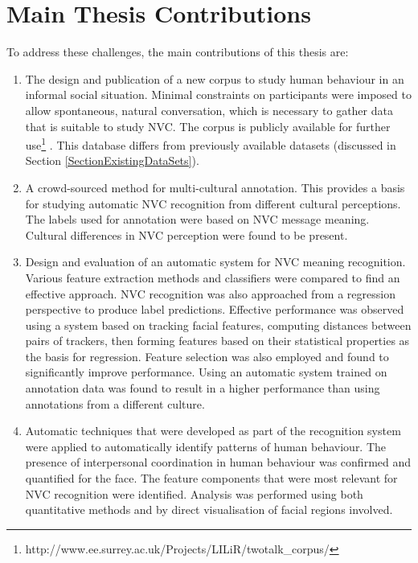 \section{Main Thesis Contributions}

To address these challenges, the main contributions of this thesis are:

\begin{enumerate}
 \item The design and publication of a new corpus to study human behaviour in an informal social situation. Minimal constraints on participants were imposed to allow spontaneous, natural conversation, which is necessary to gather data that is suitable to study \ac{NVC}. The corpus is publicly available for further use\footnote{\scriptsize{http://www.ee.surrey.ac.uk/Projects/LILiR/twotalk\_corpus/}} \cite{SheermanChase2009}. This database differs from previously available datasets (discussed in Section \ref{SectionExistingDataSets}).
 \item A crowd-sourced method for multi-cultural annotation. This provides a basis for studying automatic \ac{NVC} recognition from different cultural perceptions. The labels used for annotation were based on \ac{NVC} message meaning. Cultural differences in \ac{NVC} perception were found to be present.
 \item Design and evaluation of an automatic system for \ac{NVC} meaning recognition. Various feature extraction methods and classifiers were compared to find an effective approach. \ac{NVC} recognition was also approached from a regression perspective to produce \continuous label predictions. Effective performance was observed using a system based on tracking facial features, computing distances between pairs of trackers, then forming features based on their statistical properties as the basis for regression. Feature selection was also employed and found to significantly improve performance. Using an automatic system trained on \culturallySpecific annotation data was found to result in a higher performance than using annotations from a different culture.
 \item Automatic techniques that were developed as part of the recognition system were applied to automatically identify patterns of human behaviour. The presence of interpersonal coordination in human behaviour was confirmed and quantified for the face. The feature components that were most relevant for \ac{NVC} recognition were identified. Analysis was performed using both quantitative methods and by direct visualisation of facial regions involved.
\end{enumerate}

